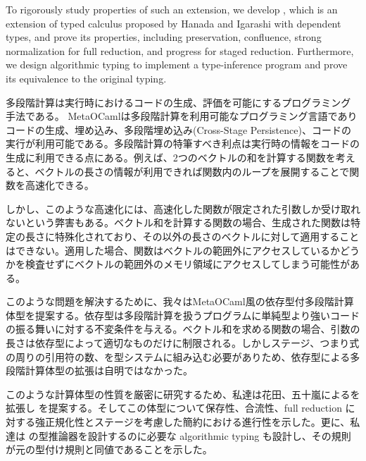 \documentclass[master,english]{kuisthesis}
\begin{document}
\begin{eabstract}

To rigorously study properties of such an extension, we develop \LMD, which is
an extension of typed calculus \LTP proposed by Hanada and Igarashi with
dependent types, and prove its properties, including preservation,
confluence, strong normalization for full reduction, and progress for
staged reduction.  Furthermore, we design algorithmic typing to implement a
type-inference program and prove its equivalence to the original typing. 



\end{eabstract}

\begin{jabstract}				%
    多段階計算は実行時におけるコードの生成、評価を可能にするプログラミング手法である。
    MetaOCamlは多段階計算を利用可能なプログラミング言語でありコードの生成、埋め込み、多段階埋め込み(Cross-Stage Persistence)、コードの実行が利用可能である。多段階計算の特筆すべき利点は実行時の情報をコードの生成に利用できる点にある。例えば、2つのベクトルの和を計算する関数を考えると、ベクトルの長さの情報が利用できれば関数内のループを展開することで関数を高速化できる。

    しかし、このような高速化には、高速化した関数が限定された引数しか受け取れないという弊害もある。ベクトル和を計算する関数の場合、生成された関数は特定の長さに特殊化されており、その以外の長さのベクトルに対して適用することはできない。適用した場合、関数はベクトルの範囲外にアクセスしているかどうかを検査せずにベクトルの範囲外のメモリ領域にアクセスしてしまう可能性がある。

    このような問題を解決するために、我々はMetaOCaml風の依存型付多段階計算体型を提案する。依存型は多段階計算を扱うプログラムに単純型より強いコードの振る舞いに対する不変条件を与える。ベクトル和を求める関数の場合、引数の長さは依存型によって適切なものだけに制限される。しかしステージ、つまり式の周りの引用符の数、を型システムに組み込む必要がありため、依存型による多段階計算体型の拡張は自明ではなかった。

    このような計算体型の性質を厳密に研究するため、私達は花田、五十嵐による\LTP を拡張し \LMD を提案する。そしてこの体型について保存性、合流性、full reduction に対する強正規化性とステージを考慮した簡約における進行性を示した。更に、私達は \LMD の型推論器を設計するのに必要な algorithmic typing も設計し、その規則が元の型付け規則と同値であることを示した。
\end{jabstract}
\end{document}
